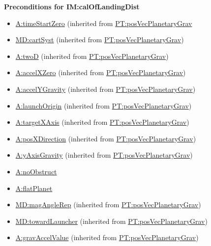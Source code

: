 \documentclass[12pt]{article}
\begin{document}
\noindent \textbf{Preconditions for IM:calOfLandingDist}
\begin{itemize}
\item \hyperref[timeStartZero]{A:timeStartZero} (inherited from \hyperref[PT:posVecPlanetaryGrav]{PT:posVecPlanetaryGrav}
\item \hyperref[MD:cartSyst]{MD:cartSyst} (inherited from \hyperref[PT:posVecPlanetaryGrav]{PT:posVecPlanetaryGrav})
\item \hyperref[twoD]{A:twoD} (inherited from \hyperref[PT:posVecPlanetaryGrav]{PT:posVecPlanetaryGrav})
\item \hyperref[accelXZero]{A:accelXZero} (inherited from \hyperref[PT:posVecPlanetaryGrav]{PT:posVecPlanetaryGrav})
\item \hyperref[accelYGravity]{A:accelYGravity} (inherited from \hyperref[PT:posVecPlanetaryGrav]{PT:posVecPlanetaryGrav})
\item \hyperref[launchOrigin]{A:launchOrigin} (inherited from \hyperref[PT:posVecPlanetaryGrav]{PT:posVecPlanetaryGrav})
\item \hyperref[targetXAxis]{A:targetXAxis} (inherited from \hyperref[PT:posVecPlanetaryGrav]{PT:posVecPlanetaryGrav})
\item \hyperref[posXDirection]{A:posXDirection} (inherited from \hyperref[PT:posVecPlanetaryGrav]{PT:posVecPlanetaryGrav})
\item \hyperref[yAxisGravity]{A:yAxisGravity} (inherited from \hyperref[PT:posVecPlanetaryGrav]{PT:posVecPlanetaryGrav})
\item \hyperref[noObstruct]{A:noObstruct}
\item \hyperref[flatPlanet]{A:flatPlanet}
\item \hyperref[MD:magAngleRep]{MD:magAngleRep} (inherited from \hyperref[PT:posVecPlanetaryGrav]{PT:posVecPlanetaryGrav})
\item \hyperref[MD:towardLauncher]{MD:towardLauncher} (inherited from \hyperref[PT:posVecPlanetaryGrav]{PT:posVecPlanetaryGrav})
\item \hyperref[gravAccelValue]{A:gravAccelValue} (inherited from \hyperref[PT:posVecPlanetaryGrav]{PT:posVecPlanetaryGrav})

\end{itemize}
\end{document}
